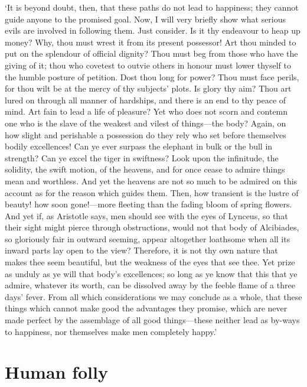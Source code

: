 \documentclass[12pt]{book}
\begin{document}
`It is beyond doubt, then, that these paths do not lead to happiness;
they cannot guide anyone to the promised goal. Now, I will very briefly
show what serious evils are involved in following them. Just consider.
Is it thy endeavour to heap up money? Why, thou must wrest it from its
present possessor! Art thou minded to put on the splendour of official
dignity? Thou must beg from those who have the giving of it; thou who
covetest to outvie others in honour must lower thyself to the humble
posture of petition. Dost thou long for power? Thou must face perils,
for thou wilt be at the mercy of thy subjects' plots. Is glory thy aim?
Thou art lured on through all manner of hardships, and there is an end
to thy peace of mind. Art fain to lead a life of pleasure? Yet who does
not scorn and contemn one who is the slave of the weakest and vilest of
things---the body? Again, on how slight and perishable a possession do
they rely who set before themselves bodily excellences! Can ye ever
surpass the elephant in bulk or the bull in strength? Can ye excel the
tiger in swiftness? Look upon the infinitude, the solidity, the swift
motion, of the heavens, and for once cease to admire things mean and
worthless. And yet the heavens are not so much to be admired on this
account as for the reason which guides them. Then, how transient is the
lustre of beauty! how soon gone!---more fleeting than the fading bloom of
spring flowers. And yet if, as Aristotle says, men should see with the
eyes of Lynceus, so that their sight might pierce through obstructions,
would not that body of Alcibiades, so gloriously fair in outward
seeming, appear altogether loathsome when all its inward parts lay open
to the view? Therefore, it is not thy own nature that makes thee seem
beautiful, but the weakness of the eyes that see thee. Yet prize as
unduly as ye will that body's excellences; so long as ye know that this
that ye admire, whatever its worth, can be dissolved away by the feeble
flame of a three days' fever. From all which considerations we may
conclude as a whole, that these things which cannot make good the
advantages they promise, which are never made perfect by the assemblage
of all good things---these neither lead as by-ways to happiness, nor
themselves make men completely happy.'




\section{Human folly}
\end{document}
